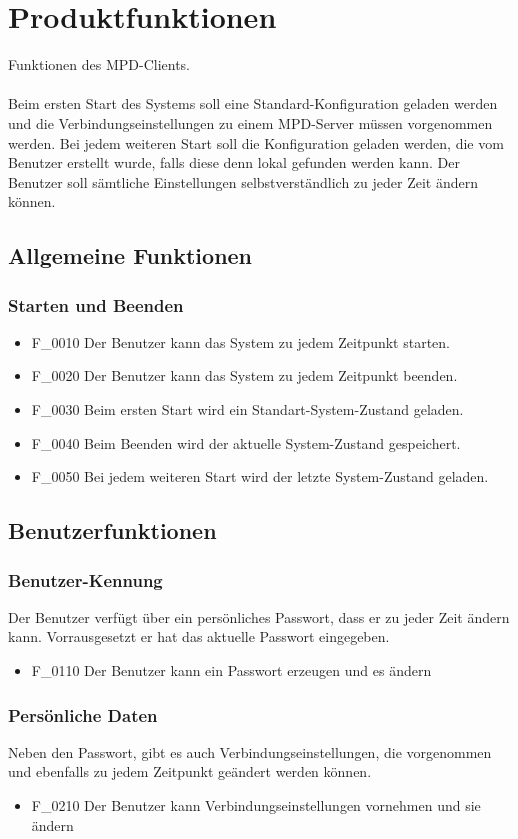 \chapter{Produktfunktionen}
Funktionen des MPD-Clients.\ \\ \\
Beim ersten Start des Systems soll eine Standard-Konfiguration geladen werden und die Verbindungseinstellungen
zu einem MPD-Server müssen vorgenommen werden. Bei jedem weiteren Start soll die Konfiguration geladen werden,
die vom Benutzer erstellt wurde, falls diese denn lokal gefunden werden kann. Der Benutzer soll sämtliche
Einstellungen selbstverständlich zu jeder Zeit ändern können.
\section{Allgemeine Funktionen}
\subsection{Starten und Beenden}
\renewcommand{\labelitemi}{•}
\begin{itemize}
	\item F\_0010 Der Benutzer kann das System zu jedem Zeitpunkt starten.
	\item F\_0020 Der Benutzer kann das System zu jedem Zeitpunkt beenden.
	\item F\_0030 Beim ersten Start wird ein Standart-System-Zustand geladen.
	\item F\_0040 Beim Beenden wird der aktuelle System-Zustand gespeichert.
	\item F\_0050 Bei jedem weiteren Start wird der letzte System-Zustand geladen.
\end{itemize}
\section{Benutzerfunktionen}
\subsection{Benutzer-Kennung}
Der Benutzer verfügt über ein persönliches Passwort, dass er zu jeder Zeit ändern kann. Vorrausgesetzt
er hat das aktuelle Passwort eingegeben.
\begin{itemize}
	\item F\_0110 Der Benutzer kann ein Passwort erzeugen und es ändern
\end{itemize}
\subsection{Persönliche Daten}
Neben den Passwort, gibt es auch Verbindungseinstellungen, die vorgenommen und ebenfalls zu jedem Zeitpunkt
geändert werden können.
\begin{itemize}
	\item F\_0210 Der Benutzer kann Verbindungseinstellungen vornehmen und sie ändern
\end{itemize}
